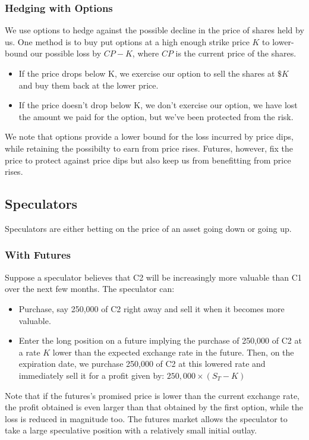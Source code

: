 \documentclass{article}
\begin{document}
\subsubsection{Hedging with Options}
We use options to hedge against the possible decline in the price of shares held by us. One method
is to buy put options at a high enough strike price $K$ to lower-bound our possible loss by $CP-K$,
where $CP$ is the current price of the shares.
\begin{itemize}
    \item If the price drops below K, we exercise our option
    to sell the shares at $\$K$ and buy them back at the lower price.
    \item If the price doesn't drop below K, we don't exercise our option, we have lost the amount
    we paid for the option, but we've been protected from the risk.
\end{itemize}
We note that options provide a lower bound for the loss incurred by price dips, while retaining
the possibilty to earn from price rises. Futures, however, fix the price to protect against
price dips but also keep us from benefitting from price rises.
\subsection{Speculators}
Speculators are either betting on the price of an asset going down or going up.
\subsubsection{With Futures}
Suppose a speculator believes that C2 will be increasingly more valuable than C1
over the next few months. The speculator can:
\begin{itemize}
    \item Purchase, say 250,000 of C2 right away and sell it when it becomes more valuable.
    \item Enter the long position on a future implying the purchase of 250,000 of C2 at a rate $K$
    lower than the expected exchange rate in the future. Then, on the expiration date, we 
    purchase 250,000 of C2 at this lowered rate and immediately sell it for a profit given by:
    $250,000\times(S_T-K)$
\end{itemize}
Note that if the futures's promised price is lower than the current exchange rate, the profit obtained
is even larger than that obtained by the first option, while the loss is reduced in magnitude too.
The futures market allows the speculator to take a large speculative position with a relatively
small initial outlay. 
\end{document}
